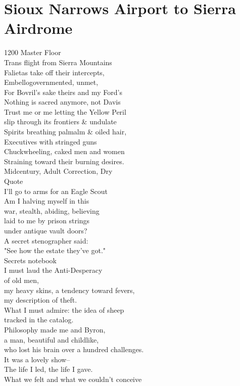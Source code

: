 \documentclass[smalldemyvopaper,11pt,twoside,onecolumn,openright,extrafontsizes]{memoir}
\begin{document}
\chapter{Sioux Narrows Airport to Sierra Airdrome}
1200 Master Floor
\\Trans flight from Sierra Mountains
\\Falietas take off their intercepts,
\\Embellogovernmented, unmet,
\\For Bovril's sake theirs and my Ford's
\\Nothing is sacred anymore, not Davis
\\Trust me or me letting the Yellow Peril
\\slip through its frontiers \& undulate
\\Spirits breathing palmalm \& oiled hair,
\\Executives with stringed guns
\\Chuckwheeling, caked men and women
\\Straining toward their burning desires.
\\Midcentury, Adult Correction, Dry
\\Quote
\\I'll go to arms for an Eagle Scout
\\Am I halving myself in this
\\war, stealth, abiding, believing
\\laid to me by prison strings
\\under antique vault doors?
\\A secret stenographer said:
\\"See how the estate they've got."
\\Secrets notebook
\\I must laud the Anti-Desperacy
\\of old men,
\\my heavy skins, a tendency toward fevers,
\\my description of theft.
\\What I must admire: the idea of sheep
\\tracked in the catalog.
\\Philosophy made me and Byron,
\\a man, beautiful and childlike,
\\who lost his brain over a hundred challenges.
\\It was a lovely show--
\\The life I led, the life I gave.
\\What we felt and what we couldn't conceive
\end{document}
